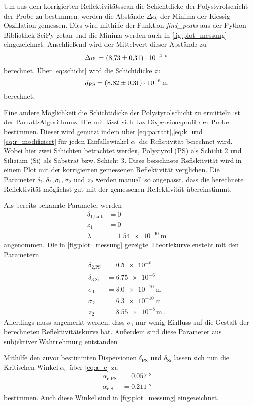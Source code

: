 Um aus dem korrigierten Reflektivitätsscan die Schichtdicke der Polystyrolschicht der Probe zu bestimmen,
werden die Abstände $\Delta\alpha_\text{i}$ der Minima der Kiessig-Oszillation gemessen.
Dies wird mithilfe der Funktion \textit{find\_peaks} aus der Python Bibliothek SciPy getan
und die Minima werden auch in \autoref{fig:plot_messung} eingezeichnet. 
Anschließend wird der Mittelwert dieser Abstände zu
\begin{equation*}
    \overline{\Delta\alpha_\text{i}} = \SI{8.73+-0.31e-4}{\,\degree}
\end{equation*}
berechnet.
Über \autoref{eq:schicht} wird die Schichtdicke zu 
\begin{equation*}
    d_\text{PS} = \SI{8.82+-0.31e-08}{\meter}
\end{equation*}
berechnet.

Eine andere Möglichkeit die Schichtidicke der Polystyrolschicht zu ermitteln ist der Parratt-Algorithmus.
Hiermit lässt sich das Dispersionsprofil der Probe bestimmen.
Dieser wird genutzt indem über \autoref{eq:parratt},\ref{eq:k} und \ref{eq:r_modifiziert} für jeden Einfallswinkel $\alpha_\text{i}$ die Refletivität berechnet wird.
Wobei hier zwei Schichten betrachtet werden, Polystyrol (PS) als Schicht 2 und Silizium (Si) als Substrat bzw. Schicht 3.
Diese berechnete Reflektivität wird in einem Plot mit der korrigierten gemessenen Reflektivität verglichen.
Die Parameter $\delta_2,\delta_3,\sigma_1,\sigma_2$ und $z_2$ werden manuell so angepasst,
dass die berechnete Reflektivität möglichst gut mit der gemessenen Reflektivität übereinstimmt.

Als bereits bekannte Parameter werden 
\begin{align*}
    \delta_\text{1,Luft} &= 0 \\
    z_1 &= 0 \\
    \lambda &= \SI{1.54e-10}{\meter}
\end{align*}
angenommen. 
Die in \autoref{fig:plot_messung} gezeigte Theoriekurve ensteht mit den Parametern
\begin{align*}
    \delta_\text{2,PS} &= \num{0.5e-6} \\
    \delta_\text{3,Si} &= \num{6.75e-6} \\
    \sigma_1 &= \SI{8.0e-10}{\meter} \\
    \sigma_2 &= \SI{6.3e-10}{\meter} \\
    z_2 &= \SI{8.55e-8}{\meter} \, .
\end{align*}
Allerdings muss angemerkt werden, dass $\sigma_1$ nur wenig Einfluss auf die Gestalt der berechneten Reflektivitätskurve hat.
Außerdem sind diese Parameter aus subjektiver Wahrnehmung entstanden.

Mithilfe den zuvor bestimmten Dispersionen $\delta_\text{PS}$ und $\delta_\text{Si}$ 
lassen sich nun die Kritischen Winkel $\alpha_\text{c}$ über \autoref{eq:a_c} zu
\begin{align*}
    \alpha_\text{c,PS} &= \SI{0.057}{\degree} \\
    \alpha_\text{c,Si} &= \SI{0.211}{\degree}
\end{align*}
bestimmen. 
Auch diese Winkel sind in \autoref{fig:plot_messung} eingezeichnet.


